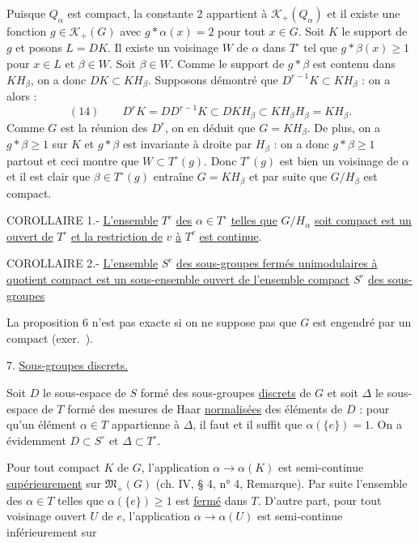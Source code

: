 Puisque $Q_\alpha$ est compact, la constante 2 appartient à $\mathcal K_+(Q_\alpha)$ et il existe une fonction $g\in\mathcal K_+(G)$ avec $g*\alpha(x)=2$ pour tout $x\in G$. Soit $K$ le support de $g$ et posons $L=DK$. Il existe un voisinage $W$ de $\alpha$ dans $T^\circ$ tel que $g*\beta(x)\geq 1$ pour $x\in L$ et $\beta\in W$. Soit $\beta\in W$. Comme le support de $g*\beta$ est contenu dans $KH_\beta$, on a donc $DK\subset KH_\beta$. Supposons démontré que $D^{r-1}K\subset KH_\beta$ : on a alors :
\[
(14)\qquad D^rK=DD^{r-1}K\subset DKH_\beta\subset KH_\beta H_\beta=KH_\beta.
\]
Comme $G$ est la réunion des $D^r$, on en déduit que $G=KH_\beta$. De plus, on a $g*\beta\geq 1$ sur $K$ et $g*\beta$ est invariante à droite par $H_\beta$ : on a donc $g*\beta\geq 1$ partout et ceci montre que $W\subset T^\circ(g)$. Donc $T^\circ(g)$ est bien un voisinage de $\alpha$ et il est clair que $\beta\in T^\circ(g)$ entraîne $G=KH_\beta$ et par suite que $G/H_\beta$ est compact.

COROLLAIRE 1.- \uline{L'ensemble} $T^c$ \uline{des} $\alpha\in T^\circ$ \uline{telles que} $G/H_\alpha$ \uline{soit compact est un ouvert de} $T^\circ$ \uline{et la restriction de} $v$ \uline{à} $T^c$ \uline{est continue}.

COROLLAIRE 2.- \uline{L'ensemble} $S^c$ \uline{des sous-groupes fermés unimodulaires à quotient compact est un sous-ensemble ouvert de l'ensemble compact} $S^\circ$ \uline{des sous-groupes} 

La proposition 6 n'est pas exacte si on ne suppose pas que $G$ est engendré par un compact (exer.\ ).

7. \uline{Sous-groupes discrets.}

Soit $D$ le sous-espace de $S$ formé des sous-groupes \uline{discrets} de $G$ et soit $\Delta$ le sous-espace de $T$ formé des mesures de Haar \uline{normalisées} des éléments de $D$ : pour qu'un élément $\alpha\in T$ appartienne à $\Delta$, il faut et il suffit que $\alpha(\{e\})=1$. On a évidemment $D\subset S^\circ$ et $\Delta\subset T^\circ$.

Pour tout compact $K$ de $G$, l'application $\alpha\longrightarrow\alpha(K)$ est semi-continue \uline{supérieurement} sur $\mathfrak M_+(G)$ (ch. IV, § 4, n° 4, Remarque). Par suite l'ensemble des $\alpha\in T$ telles que $\alpha(\{e\})\geq 1$ est \uline{fermé} dans $T$. D'autre part, pour tout voisinage ouvert $U$ de $e$, l'application $\alpha\longrightarrow\alpha(U)$ est semi-continue inférieurement sur
